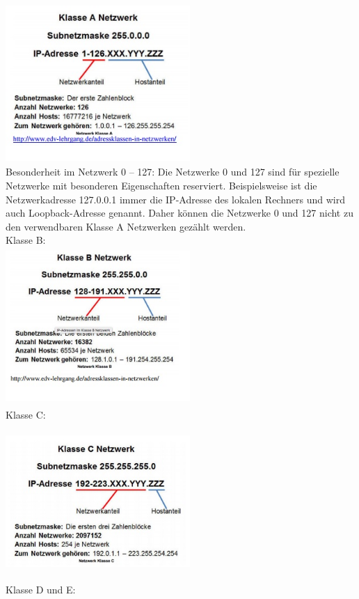 \documentclass[12pt,a4paper]{report}
\begin{document}
\includegraphics[width = 7cm, height = 6cm]{classa.jpg}
\\
Besonderheit im Netzwerk 0 – 127:
Die Netzwerke 0 und 127 sind für spezielle Netzwerke mit besonderen Eigenschaften
reserviert. Beispielsweise ist die Netzwerkadresse 127.0.0.1 immer die IP-Adresse des lokalen
Rechners und wird auch Loopback-Adresse genannt. Daher können die Netzwerke 0 und 127
nicht zu den verwendbaren Klasse A Netzwerken gezählt werden.\\
Klasse B:\\
\includegraphics[width = 7cm, height = 6cm]{classb.jpg}
\\
Klasse C:\\
\includegraphics[width = 7cm, height = 6cm]{classc.jpg}
\\
Klasse D und E:\\
\end{document}
